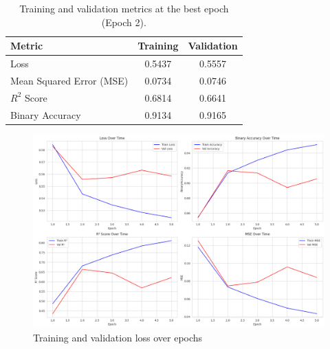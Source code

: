 \documentclass[twoside]{ctuthesis}
\theoremstyle{plain}
\theoremstyle{definition}
\theoremstyle{note}
\begin{document}
\begin{table}[ht]
    \centering
    \caption{Training and validation metrics at the best epoch (Epoch 2).}
    \label{tab:best_epoch_results}
    \begin{tabular}{lcc}
        \toprule
        \textbf{Metric} & \textbf{Training} & \textbf{Validation} \\
        \midrule
        Loss            & 0.5437 & 0.5557 \\
        Mean Squared Error (MSE) & 0.0734 & 0.0746 \\
        $R^2$ Score     & 0.6814 & 0.6641 \\
        Binary Accuracy & 0.9134 & 0.9165 \\
        \bottomrule
    \end{tabular}
\end{table}

\begin{figure}[htbp]
	\centering
	\includegraphics[scale=0.35]{figures/training_full.png}
	\caption{Training and validation loss over epochs}
	\label{fig:training_stats}
\end{figure}
\end{document}
